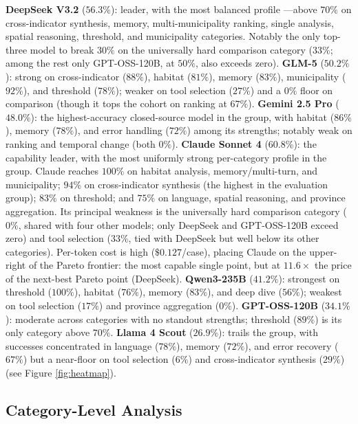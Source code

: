 \documentclass[sigconf]{acmart}
\begin{document}
\textbf{DeepSeek V3.2} ($56.3\%$): leader, with the most balanced profile ---above $70\%$ on cross-indicator synthesis, memory, multi-municipality ranking, single analysis, spatial reasoning, threshold, and municipality categories. Notably the only top-three model to break $30\%$ on the universally hard comparison category ($33\%$; among the rest only GPT-OSS-120B, at $50\%$, also exceeds zero). \textbf{GLM-5} ($50.2\%$): strong on cross-indicator ($88\%$), habitat ($81\%$), memory ($83\%$), municipality ($92\%$), and threshold ($78\%$); weaker on tool selection ($27\%$) and a $0\%$ floor on comparison (though it tops the cohort on ranking at $67\%$). \textbf{Gemini 2.5 Pro} ($48.0\%$): the highest-accuracy closed-source model in the group, with habitat ($86\%$), memory ($78\%$), and error handling ($72\%$) among its strengths; notably weak on ranking and temporal change (both $0\%$). \textbf{Claude Sonnet 4} ($60.8\%$): the capability leader, with the most uniformly strong per-category profile in the group. Claude reaches $100\%$ on habitat analysis, memory/multi-turn, and municipality; $94\%$ on cross-indicator synthesis (the highest in the evaluation group); $83\%$ on threshold; and $75\%$ on language, spatial reasoning, and province aggregation. Its principal weakness is the universally hard comparison category ($0\%$, shared with four other models; only DeepSeek and GPT-OSS-120B exceed zero) and tool selection ($33\%$, tied with DeepSeek but well below its other categories). Per-token cost is high ($\$0.127$/case), placing Claude on the upper-right of the Pareto frontier: the most capable single point, but at $11.6\times$ the price of the next-best Pareto point (DeepSeek). \textbf{Qwen3-235B} ($41.2\%$): strongest on threshold ($100\%$), habitat ($76\%$), memory ($83\%$), and deep dive ($56\%$); weakest on tool selection ($17\%$) and province aggregation ($0\%$). \textbf{GPT-OSS-120B} ($34.1\%$): moderate across categories with no standout strengths; threshold ($89\%$) is its only category above $70\%$. \textbf{Llama 4 Scout} ($26.9\%$): trails the group, with successes concentrated in language ($78\%$), memory ($72\%$), and error recovery ($67\%$) but a near-floor on tool selection ($6\%$) and cross-indicator synthesis ($29\%$) (see Figure \ref{fig:heatmap}).


\subsection{Category-Level Analysis}
\label{sec:category}
\end{document}
